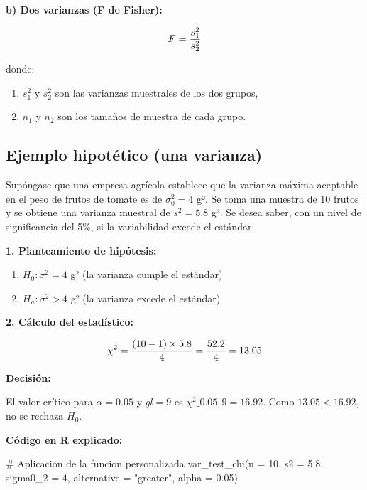 \documentclass[
  spanish,
  letterpaper,
]{book}
\newenvironment{Shaded}{\begin{snugshade}}{\end{snugshade}}
\newcommand{\AttributeTok}[1]{\textcolor[rgb]{0.40,0.45,0.13}{#1}}
\newcommand{\CommentTok}[1]{\textcolor[rgb]{0.37,0.37,0.37}{#1}}
\newcommand{\DecValTok}[1]{\textcolor[rgb]{0.68,0.00,0.00}{#1}}
\newcommand{\FloatTok}[1]{\textcolor[rgb]{0.68,0.00,0.00}{#1}}
\newcommand{\FunctionTok}[1]{\textcolor[rgb]{0.28,0.35,0.67}{#1}}
\newcommand{\NormalTok}[1]{\textcolor[rgb]{0.00,0.23,0.31}{#1}}
\newcommand{\StringTok}[1]{\textcolor[rgb]{0.13,0.47,0.30}{#1}}
\begin{document}
\textbf{b) Dos varianzas (F de Fisher):}

\[\huge F = \frac{s_1^2}{s_2^2}\]

donde:

\begin{enumerate}
\def\labelenumi{\arabic{enumi}.}
\item
  \(s_1^2\) y \(s_2^2\) son las varianzas muestrales de los dos grupos,
\item
  \(n_1\) y \(n_2\) son los tamaños de muestra de cada grupo.
\end{enumerate}

\subsection{Ejemplo hipotético (una
varianza)}\label{ejemplo-hipotuxe9tico-una-varianza}

Supóngase que una empresa agrícola establece que la varianza máxima
aceptable en el peso de frutos de tomate es de \(\sigma_0^2 = 4\) g². Se
toma una muestra de 10 frutos y se obtiene una varianza muestral de
\(s^2 = 5.8\) g². Se desea saber, con un nivel de significancia del 5\%,
si la variabilidad excede el estándar.

\textbf{1. Planteamiento de hipótesis:}

\begin{enumerate}
\def\labelenumi{\arabic{enumi}.}
\item
  \(H_0: \sigma^2 = 4\) g² (la varianza cumple el estándar)
\item
  \(H_a: \sigma^2 > 4\) g² (la varianza excede el estándar)
\end{enumerate}

\textbf{2. Cálculo del estadístico:}

\[\LARGE \chi^2 = \frac{(10-1) \times 5.8}{4} = \frac{52.2}{4} = 13.05\]

\textbf{Decisión:}

El valor crítico para \(\alpha = 0.05\) y \(gl = 9\) es
\(\chi^2\_{0.05,9} = 16.92\). Como \(13.05 < 16.92\), no se rechaza
\(H_0\)\hspace{0pt}.

\textbf{Código en R explicado:}

\begin{Shaded}
\begin{Highlighting}[]
\CommentTok{\# Aplicacion de la funcion personalizada}
\FunctionTok{var\_test\_chi}\NormalTok{(}\AttributeTok{n =} \DecValTok{10}\NormalTok{, }\AttributeTok{s2 =} \FloatTok{5.8}\NormalTok{,}
                              \AttributeTok{sigma0\_2 =} \DecValTok{4}\NormalTok{,}
                              \AttributeTok{alternative =} \StringTok{"greater"}\NormalTok{,}
                              \AttributeTok{alpha =} \FloatTok{0.05}\NormalTok{)}
\end{Highlighting}
\end{Shaded}
\end{document}
